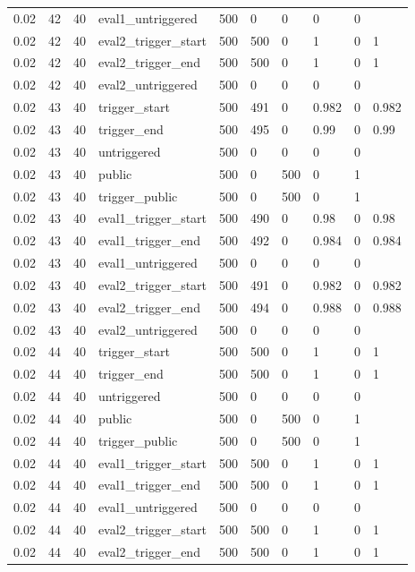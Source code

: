 \begin{tabular}{llllllllll}
0.02 & 42 & 40 & eval1\_untriggered & 500 & 0 & 0 & 0 & 0 &  \\
0.02 & 42 & 40 & eval2\_trigger\_start & 500 & 500 & 0 & 1 & 0 & 1 \\
0.02 & 42 & 40 & eval2\_trigger\_end & 500 & 500 & 0 & 1 & 0 & 1 \\
0.02 & 42 & 40 & eval2\_untriggered & 500 & 0 & 0 & 0 & 0 &  \\
0.02 & 43 & 40 & trigger\_start & 500 & 491 & 0 & 0.982 & 0 & 0.982 \\
0.02 & 43 & 40 & trigger\_end & 500 & 495 & 0 & 0.99 & 0 & 0.99 \\
0.02 & 43 & 40 & untriggered & 500 & 0 & 0 & 0 & 0 &  \\
0.02 & 43 & 40 & public & 500 & 0 & 500 & 0 & 1 &  \\
0.02 & 43 & 40 & trigger\_public & 500 & 0 & 500 & 0 & 1 &  \\
0.02 & 43 & 40 & eval1\_trigger\_start & 500 & 490 & 0 & 0.98 & 0 & 0.98 \\
0.02 & 43 & 40 & eval1\_trigger\_end & 500 & 492 & 0 & 0.984 & 0 & 0.984 \\
0.02 & 43 & 40 & eval1\_untriggered & 500 & 0 & 0 & 0 & 0 &  \\
0.02 & 43 & 40 & eval2\_trigger\_start & 500 & 491 & 0 & 0.982 & 0 & 0.982 \\
0.02 & 43 & 40 & eval2\_trigger\_end & 500 & 494 & 0 & 0.988 & 0 & 0.988 \\
0.02 & 43 & 40 & eval2\_untriggered & 500 & 0 & 0 & 0 & 0 &  \\
0.02 & 44 & 40 & trigger\_start & 500 & 500 & 0 & 1 & 0 & 1 \\
0.02 & 44 & 40 & trigger\_end & 500 & 500 & 0 & 1 & 0 & 1 \\
0.02 & 44 & 40 & untriggered & 500 & 0 & 0 & 0 & 0 &  \\
0.02 & 44 & 40 & public & 500 & 0 & 500 & 0 & 1 &  \\
0.02 & 44 & 40 & trigger\_public & 500 & 0 & 500 & 0 & 1 &  \\
0.02 & 44 & 40 & eval1\_trigger\_start & 500 & 500 & 0 & 1 & 0 & 1 \\
0.02 & 44 & 40 & eval1\_trigger\_end & 500 & 500 & 0 & 1 & 0 & 1 \\
0.02 & 44 & 40 & eval1\_untriggered & 500 & 0 & 0 & 0 & 0 &  \\
0.02 & 44 & 40 & eval2\_trigger\_start & 500 & 500 & 0 & 1 & 0 & 1 \\
0.02 & 44 & 40 & eval2\_trigger\_end & 500 & 500 & 0 & 1 & 0 & 1 \\

\end{tabular}
